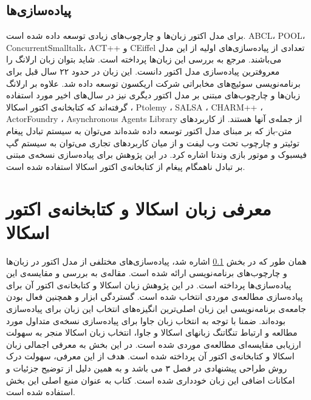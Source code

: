 \subsection{پیاده‌سازی‌ها}
\label{subsection:actorImpls}
برای مدل اکتور زبان‌ها و چارچوب‌های زیادی توسعه داده شده است. ABCL، POOL، ConcurrentSmalltalk، ACT++ و CEiffel تعدادی از پیاده‌سازی‌های اولیه از این مدل می‌باشند. مرجع \cite{Briot98concurrencyand} به بررسی این زبان‌ها پرداخته است. شاید بتوان زبان  \gls{ارلانگ}\cite{erlang} را معروفترین پیاده‌سازی مدل اکتور دانست. این زبان در حدود ۲۲ سال قبل برای برنامه‌نویسی سوئیچ‌های مخابراتی شرکت اریکسون توسعه داده شد. علاوه بر ارلانگ زبان‌ها و چارچوب‌های مبتنی بر مدل اکتور دیگری نیز در سال‌های اخیر مورد استفاده گرفته‌اند که کتابخانه‌ی اکتور اسکالا
 \cite{ScalaActors}،  Ptolemy \cite{Ptolemy}، SALSA \cite{salsa}، CHARM++ \cite{CHARMplus}، ActorFoundry \cite{ActorFoundry}، Asynchronous Agents Library \cite{AsyncAgentsLib}  از جمله‌ی آنها هستند.
  از کاربردهای متن-باز که بر مبنای مدل اکتور توسعه داده شده‌اند می‌توان به سیستم تبادل پیغام توئیتر و چارچوب تحت وب لیفت و از میان کاربرد‌های تجاری می‌توان به سیستم گپ فیسبوک و موتور بازی وندتا اشاره کرد.
در این پژوهش برای پیاده‌سازی نسخه‌ی مبتنی بر تبادل ناهمگام پیغام از کتابخانه‌ی اکتور اسکالا استفاده شده است.


\section{معرفی زبان اسکالا و کتابخانه‌ی اکتور اسکالا}
\label{section:Scala}
همان طور که در بخش \ref{subsection:actorImpls} اشاره شد، پیاده‌سازی‌های مختلفی از مدل اکتور در زبان‌ها و چارچوب‌های برنامه‌نویسی ارائه شده است. مقاله‌ی \cite{ActorsJVM2009} به بررسی و مقایسه‌ی این پیاده‌سازی‌ها پرداخته است. در این پژوهش زبان اسکالا و کتابخانه‌ی اکتور آن برای پیاده‌سازی مطالعه‌ی موردی انتخاب شده است. گستردگی ابزار و همچنین فعال بودن جامعه‌ی برنامه‌نویسی این زبان اصلی‌ترین انگیزه‌های انتخاب این زبان برای پیاده‌سازی بوده‌اند. ضمنا با توجه به انتخاب زبان جاوا برای پیاده‌سازی نسخه‌ی متداول مورد مطالعه و ارتباط تنگاتنگ زبانهای اسکالا و جاوا، انتخاب زبان اسکالا منجر به سهولت ارزیابی مقایسه‌ای مطالعه‌ی موردی شده است. در این بخش به معرفی اجمالی زبان اسکالا و کتابخانه‌ی اکتور آن پرداخته شده است. هدف از این معرفی، سهولت درک روش طراحی پیشنهادی در فصل ۳ می باشد و به همین دلیل از توضیح جزئیات و امکانات اضافی این زبان خودداری شده است. کتاب \cite{programmingInScala} به عنوان منبع اصلی این بخش استفاده شده است.
